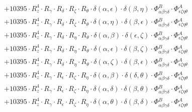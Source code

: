 \documentclass{article}
\begin{document}
\begin{equation}
\begin{array}{c}
 \\[0.2em] 		 + 10395 \cdot R_{z}^{4} \cdot R_{\gamma{}} \cdot R_{\delta{}} \cdot R_{\zeta{}} \cdot R_{\theta{}} \cdot \delta{}\left(\alpha{}, \epsilon{}\right) \cdot \delta{}\left(\beta{}, \eta{}\right) \cdot \Phi{}^{B}_{\alpha{}\beta{}\gamma{}\delta{}} \cdot \Phi{}^{A}_{\epsilon{}\zeta{}\eta{}\theta{}} 
 \\[0.2em] 		 + 10395 \cdot R_{z}^{4} \cdot R_{\gamma{}} \cdot R_{\delta{}} \cdot R_{\zeta{}} \cdot R_{\theta{}} \cdot \delta{}\left(\alpha{}, \eta{}\right) \cdot \delta{}\left(\beta{}, \epsilon{}\right) \cdot \Phi{}^{B}_{\alpha{}\beta{}\gamma{}\delta{}} \cdot \Phi{}^{A}_{\epsilon{}\zeta{}\eta{}\theta{}} 
 \\[0.2em] 		 + 10395 \cdot R_{z}^{4} \cdot R_{\gamma{}} \cdot R_{\delta{}} \cdot R_{\eta{}} \cdot R_{\theta{}} \cdot \delta{}\left(\alpha{}, \beta{}\right) \cdot \delta{}\left(\epsilon{}, \zeta{}\right) \cdot \Phi{}^{B}_{\alpha{}\beta{}\gamma{}\delta{}} \cdot \Phi{}^{A}_{\epsilon{}\zeta{}\eta{}\theta{}} 
 \\[0.2em] 		 + 10395 \cdot R_{z}^{4} \cdot R_{\gamma{}} \cdot R_{\delta{}} \cdot R_{\eta{}} \cdot R_{\theta{}} \cdot \delta{}\left(\alpha{}, \epsilon{}\right) \cdot \delta{}\left(\beta{}, \zeta{}\right) \cdot \Phi{}^{B}_{\alpha{}\beta{}\gamma{}\delta{}} \cdot \Phi{}^{A}_{\epsilon{}\zeta{}\eta{}\theta{}} 
 \\[0.2em] 		 + 10395 \cdot R_{z}^{4} \cdot R_{\gamma{}} \cdot R_{\delta{}} \cdot R_{\eta{}} \cdot R_{\theta{}} \cdot \delta{}\left(\alpha{}, \zeta{}\right) \cdot \delta{}\left(\beta{}, \epsilon{}\right) \cdot \Phi{}^{B}_{\alpha{}\beta{}\gamma{}\delta{}} \cdot \Phi{}^{A}_{\epsilon{}\zeta{}\eta{}\theta{}} 
 \\[0.2em] 		 + 10395 \cdot R_{z}^{4} \cdot R_{\gamma{}} \cdot R_{\epsilon{}} \cdot R_{\zeta{}} \cdot R_{\eta{}} \cdot \delta{}\left(\alpha{}, \beta{}\right) \cdot \delta{}\left(\delta{}, \theta{}\right) \cdot \Phi{}^{B}_{\alpha{}\beta{}\gamma{}\delta{}} \cdot \Phi{}^{A}_{\epsilon{}\zeta{}\eta{}\theta{}} 
 \\[0.2em] 		 + 10395 \cdot R_{z}^{4} \cdot R_{\gamma{}} \cdot R_{\epsilon{}} \cdot R_{\zeta{}} \cdot R_{\eta{}} \cdot \delta{}\left(\alpha{}, \delta{}\right) \cdot \delta{}\left(\beta{}, \theta{}\right) \cdot \Phi{}^{B}_{\alpha{}\beta{}\gamma{}\delta{}} \cdot \Phi{}^{A}_{\epsilon{}\zeta{}\eta{}\theta{}} 
 \\[0.2em] 		 + 10395 \cdot R_{z}^{4} \cdot R_{\gamma{}} \cdot R_{\epsilon{}} \cdot R_{\zeta{}} \cdot R_{\eta{}} \cdot \delta{}\left(\alpha{}, \theta{}\right) \cdot \delta{}\left(\beta{}, \delta{}\right) \cdot \Phi{}^{B}_{\alpha{}\beta{}\gamma{}\delta{}} \cdot \Phi{}^{A}_{\epsilon{}\zeta{}\eta{}\theta{}} 

\end{array}
\end{equation}
\end{document}
